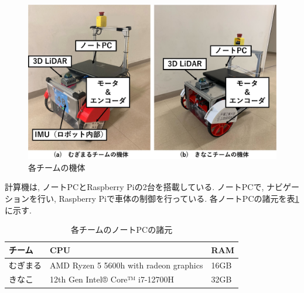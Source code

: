\documentclass[twocolumn,9pt]{jsproceedings}
\begin{document}
 \begin{figure}[htbp]
   \begin{center}
     \includegraphics[width=1.0\linewidth]{figs/robot.eps}
     \caption{各チームの機体}
     \label{fig:robot}
   \end{center}
 \end{figure}



計算機は, ノートPCとRaspberry Piの2台を搭載している. 
ノートPCで, ナビゲーションを行い, 
Raspberry Piで車体の制御を行っている. 
各ノートPCの諸元を表\ref{table:laptop}に示す. 

\begin{table}[H]
  \centering
  \caption{各チームのノートPCの諸元}
  \label{table:laptop}
	  \begin{tabular}{|l|p{5.0cm}|l|}
    \hline
    チーム   & CPU & RAM\\ 
    \hline
    むぎまる & AMD Ryzen 5 5600h with radeon graphics & 16GB \\
    \hline
    きなこ   & 12th Gen Intel® Core™ i7-12700H  & 32GB \\
    \hline
  \end{tabular}
\end{table}
\end{document}
